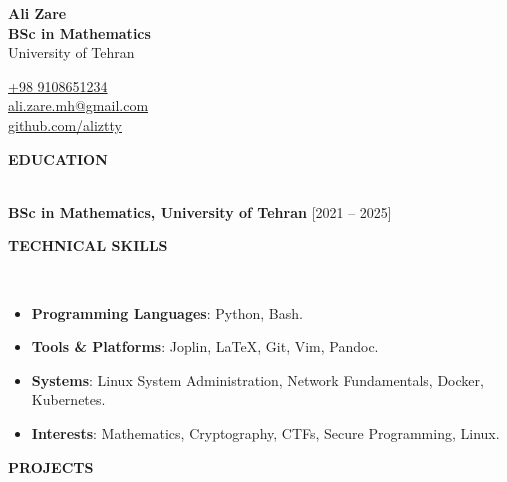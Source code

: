 \documentclass[10pt,article]{article}
\newcommand{\resheading}[1]{%
  {\small \colorbox{mygrey}{%
  \begin{minipage}{0.99\textwidth}\centering \textbf{#1 \vphantom{p\^{E}}}\end{minipage}}}}
\begin{document}
\begin{table}
\begin{minipage}{.45\linewidth}
      \begin{flushleft}
      	\textbf{\Large Ali Zare} \\
	    \textbf{BSc in Mathematics} \\
        University of Tehran
      \end{flushleft}
\end{minipage}
\hfill
\begin{minipage}{.45\linewidth}
      \begin{flushright}
	\href{tel:+989108651234}{+98 9108651234}\\
	\href{mailto:ali.zare.mh@gmail.com}{ali.zare.mh@gmail.com} \\
	\href{https://github.com/aliztty}{github.com/aliztty}
      \end{flushright}
\end{minipage}
\end{table}

\noindent
\resheading{EDUCATION}\\[0.4cm]
\textbf{BSc in Mathematics, University of Tehran} \hfill {[2021 – 2025]}\\

\noindent
\resheading{TECHNICAL SKILLS}\\[-0.5cm]

\begin{itemize}
  \item \textbf{Programming Languages}: Python, Bash.\\[-0.4cm]
  \item \textbf{Tools \& Platforms}: Joplin, \LaTeX, Git, Vim, Pandoc.\\[-0.4cm]
  \item \textbf{Systems}: Linux System Administration, Network Fundamentals, Docker, Kubernetes. \\[-0.4cm]
  \item \textbf{Interests}: Mathematics, Cryptography, CTFs, Secure Programming, Linux.
\end{itemize}

\noindent
\resheading{PROJECTS}\\[-0.5cm]
\end{document}
